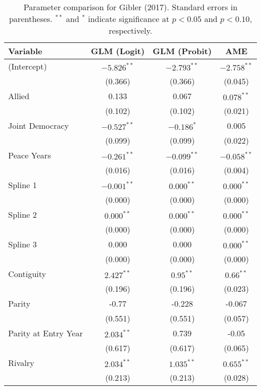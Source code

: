 \begin{table}[ht]
\centering
\begingroup\normalsize
\begin{tabular}{lccc}
 Variable & GLM (Logit) & GLM (Probit) & AME \\ 
  \hline
\hline
(Intercept) & $-5.826^{\ast\ast}$ & $-2.793^{\ast\ast}$ & $-2.758^{\ast\ast}$ \\ 
   & (0.366) & (0.366) & (0.045) \\ 
  Allied & 0.133 & 0.067 & $0.078^{\ast\ast}$ \\ 
   & (0.102) & (0.102) & (0.021) \\ 
  Joint Democracy & $-0.527^{\ast\ast}$ & $-0.186^{\ast}$ & 0.005 \\ 
   & (0.099) & (0.099) & (0.022) \\ 
  Peace Years & $-0.261^{\ast\ast}$ & $-0.099^{\ast\ast}$ & $-0.058^{\ast\ast}$ \\ 
   & (0.016) & (0.016) & (0.004) \\ 
  Spline 1 & $-0.001^{\ast\ast}$ & $0.000^{\ast\ast}$ & $0.000^{\ast\ast}$ \\ 
   & (0.000) & (0.000) & (0.000) \\ 
  Spline 2 & $0.000^{\ast\ast}$ & $0.000^{\ast\ast}$ & $0.000^{\ast\ast}$ \\ 
   & (0.000) & (0.000) & (0.000) \\ 
  Spline 3 & 0.000 & 0.000 & $0.000^{\ast\ast}$ \\ 
   & (0.000) & (0.000) & (0.000) \\ 
  Contiguity & $2.427^{\ast\ast}$ & $0.95^{\ast\ast}$ & $0.66^{\ast\ast}$ \\ 
   & (0.196) & (0.196) & (0.023) \\ 
  Parity & -0.77 & -0.228 & -0.067 \\ 
   & (0.551) & (0.551) & (0.057) \\ 
  Parity at Entry Year & $2.034^{\ast\ast}$ & 0.739 & -0.05 \\ 
   & (0.617) & (0.617) & (0.065) \\ 
  Rivalry & $2.034^{\ast\ast}$ & $1.035^{\ast\ast}$ & $0.655^{\ast\ast}$ \\ 
   & (0.213) & (0.213) & (0.028) \\ 
   \hline
\hline
\end{tabular}
\endgroup
\caption{Parameter comparison for Gibler (2017). Standard errors in parentheses. $^{**}$ and $^{*}$ indicate significance at $p<0.05$ and $p<0.10$, respectively.} 
\label{tab:gibler_coef}
\end{table}
